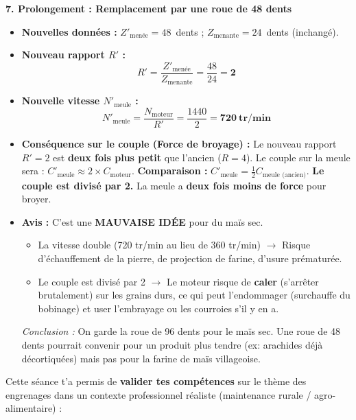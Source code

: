 \documentclass[11pt]{article}
\newcounter{popsec}
\newcounter{popsub}
\newcommand{\courssub}[1]{%
  \stepcounter{popsub}%
  \par\vspace{9pt}\noindent{\popxbold\fontsize{11.5}{13}\selectfont\color{popink}{\color{poporange}\thepopsec.\thepopsub}\hspace{6pt}#1}\par\nopagebreak\vspace{4pt}
}
\begin{document}
\begin{exoresolu}
\textbf{7. Prolongement : Remplacement par une roue de 48 dents}
\begin{itemize}
    \item \textbf{Nouvelles données :} $Z'_{\text{menée}} = 48$~dents ; $Z_{\text{menante}} = 24$~dents (inchangé).
    \item \textbf{Nouveau rapport $R'$ :}
    \[
    R' = \frac{Z'_{\text{menée}}}{Z_{\text{menante}}} = \frac{48}{24} = \mathbf{2}
    \]
    \item \textbf{Nouvelle vitesse $N'_{\text{meule}}$ :}
    \[
    N'_{\text{meule}} = \frac{N_{\text{moteur}}}{R'} = \frac{1440}{2} = \mathbf{720~tr/min}
    \]
    \item \textbf{Conséquence sur le couple (Force de broyage) :}
    Le nouveau rapport $R' = 2$ est \textbf{deux fois plus petit} que l'ancien ($R=4$).
    Le couple sur la meule sera : $C'_{\text{meule}} \approx 2 \times C_{\text{moteur}}$.
    \textbf{Comparaison :} $C'_{\text{meule}} = \frac{1}{2} C_{\text{meule (ancien)}}$.
    \textbf{Le couple est divisé par 2.} La meule a \textbf{deux fois moins de force} pour broyer.
    \item \textbf{Avis :} C'est une \textbf{MAUVAISE IDÉE} pour du maïs sec.
    \begin{itemize}
        \item La vitesse double (720 tr/min au lieu de 360 tr/min) $\rightarrow$ Risque d'échauffement de la pierre, de projection de farine, d'usure prématurée.
        \item Le couple est divisé par 2 $\rightarrow$ Le moteur risque de \textbf{caler} (s'arrêter brutalement) sur les grains durs, ce qui peut l'endommager (surchauffe du bobinage) et user l'embrayage ou les courroies s'il y en a.
    \end{itemize}
    \emph{Conclusion :} On garde la roue de 96 dents pour le maïs sec. Une roue de 48 dents pourrait convenir pour un produit plus tendre (ex: arachides déjà décortiquées) mais pas pour la farine de maïs villageoise.
\end{itemize}
\end{exoresolu}

\courssub{Bilan de la séance}
Cette séance t'a permis de \textbf{valider tes compétences} sur le thème des engrenages dans un contexte professionnel réaliste (maintenance rurale / agro-alimentaire) :
\end{document}
